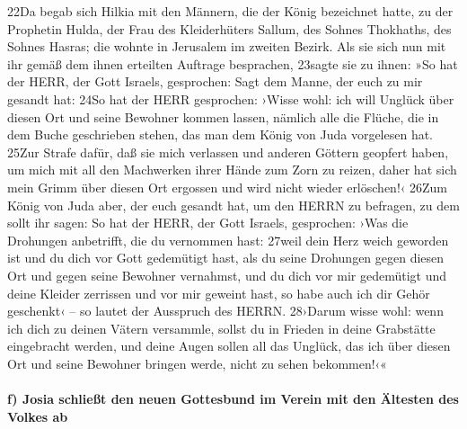 22Da begab sich Hilkia mit den Männern, die der König bezeichnet hatte,
zu der Prophetin Hulda, der Frau des Kleiderhüters Sallum, des Sohnes
Thokhaths, des Sohnes Hasras; die wohnte in Jerusalem im zweiten Bezirk.
Als sie sich nun mit ihr gemäß dem ihnen erteilten Auftrage besprachen,
23sagte sie zu ihnen: »So hat der HERR, der Gott Israels, gesprochen:
Sagt dem Manne, der euch zu mir gesandt hat: 24So hat der HERR
gesprochen: ›Wisse wohl: ich will Unglück über diesen Ort und seine
Bewohner kommen lassen, nämlich alle die Flüche, die in dem Buche
geschrieben stehen, das man dem König von Juda vorgelesen hat. 25Zur
Strafe dafür, daß sie mich verlassen und anderen Göttern geopfert haben,
um mich mit all den Machwerken ihrer Hände zum Zorn zu reizen, daher hat
sich mein Grimm über diesen Ort ergossen und wird nicht wieder
erlöschen!‹ 26Zum König von Juda aber, der euch gesandt hat, um den
HERRN zu befragen, zu dem sollt ihr sagen: So hat der HERR, der Gott
Israels, gesprochen: ›Was die Drohungen anbetrifft, die du vernommen
hast: 27weil dein Herz weich geworden ist und du dich vor Gott
gedemütigt hast, als du seine Drohungen gegen diesen Ort und gegen seine
Bewohner vernahmst, und du dich vor mir gedemütigt und deine Kleider
zerrissen und vor mir geweint hast, so habe auch ich dir Gehör
geschenkt‹ -- so lautet der Ausspruch des HERRN. 28›Darum wisse wohl:
wenn ich dich zu deinen Vätern versammle, sollst du in Frieden in deine
Grabstätte eingebracht werden, und deine Augen sollen all das Unglück,
das ich über diesen Ort und seine Bewohner bringen werde, nicht zu sehen
bekommen!‹«

\hypertarget{f-josia-schlieuxdft-den-neuen-gottesbund-im-verein-mit-den-uxe4ltesten-des-volkes-ab}{%
\paragraph{f) Josia schließt den neuen Gottesbund im Verein mit den
Ältesten des Volkes
ab}\label{f-josia-schlieuxdft-den-neuen-gottesbund-im-verein-mit-den-uxe4ltesten-des-volkes-ab}}

